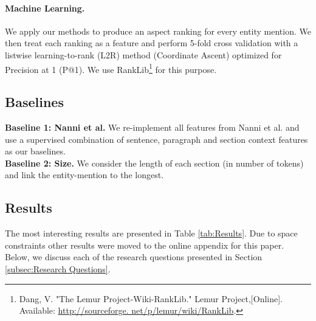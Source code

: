 \paragraph{\textbf{Machine Learning.}}
We apply our methods to produce an aspect ranking for every entity mention. We then treat each ranking as a feature and perform 5-fold cross validation with a listwise learning-to-rank (L2R) method (Coordinate Ascent) optimized for Precision at 1 (P@1). We use RankLib\footnote{Dang, V. "The Lemur Project-Wiki-RankLib." Lemur Project,[Online]. Available: \url{http://sourceforge. net/p/lemur/wiki/RankLib}.} for this purpose. 


\subsection{Baselines}
\label{subsec:Baselines}

\textbf{Baseline 1: Nanni et al.} We re-implement all features from Nanni et al. \cite{nanni2018entity} and use a supervised combination of sentence, paragraph and section context features as our baselines. \\
\textbf{Baseline 2: Size.} We consider the length of each section (in number of tokens) and link the entity-mention to the longest. \\

\subsection{Results}
\label{subsec:Results}
The most interesting results are presented in Table \ref{tab:Results}. Due to space constraints other results were moved to the online appendix for this paper. Below, we discuss each of the research questions presented in Section \ref{subsec:Research Questions}.


